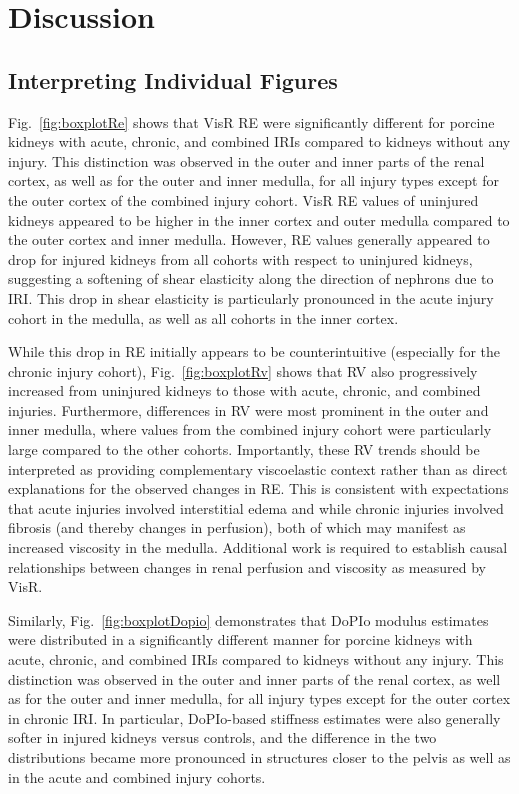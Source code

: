 
\section{Discussion}
\subsection{Interpreting Individual Figures}

Fig.~\ref{fig:boxplotRe} shows that VisR RE were significantly different for porcine kidneys with acute, chronic, and combined IRIs compared to kidneys without any injury. This distinction was observed in the outer and inner parts of the renal cortex, as well as for the outer and inner medulla, for all injury types except for the outer cortex of the combined injury cohort. VisR RE values of uninjured kidneys appeared to be higher in the inner cortex and outer medulla compared to the outer cortex and inner medulla. However, RE values generally appeared to drop for injured kidneys from all cohorts with respect to uninjured kidneys, suggesting a softening of shear elasticity along the direction of nephrons due to IRI. This drop in shear elasticity is particularly pronounced in the acute injury cohort in the medulla, as well as all cohorts in the inner cortex.

While this drop in RE initially appears to be counterintuitive (especially for the chronic injury cohort), Fig.~\ref{fig:boxplotRv} shows that RV also progressively increased from uninjured kidneys to those with acute, chronic, and combined injuries. Furthermore, differences in RV were most prominent in the outer and inner medulla, where values from the combined injury cohort were particularly large compared to the other cohorts. Importantly, these RV trends should be interpreted as providing complementary viscoelastic context rather than as direct explanations for the observed changes in RE. This is consistent with expectations that acute injuries involved interstitial edema and while chronic injuries involved fibrosis (and thereby changes in perfusion), both of which may manifest as increased viscosity in the medulla. Additional work is required to establish causal relationships between changes in renal perfusion and viscosity as measured by VisR.

Similarly, Fig.~\ref{fig:boxplotDopio} demonstrates that DoPIo modulus estimates were distributed in a significantly different manner for porcine kidneys with acute, chronic, and combined IRIs compared to kidneys without any injury. This distinction was observed in the outer and inner parts of the renal cortex, as well as for the outer and inner medulla, for all injury types except for the outer cortex in chronic IRI. In particular, DoPIo-based stiffness estimates were also generally softer in injured kidneys versus controls, and the difference in the two distributions became more pronounced in structures closer to the pelvis as well as in the acute and combined injury cohorts.

